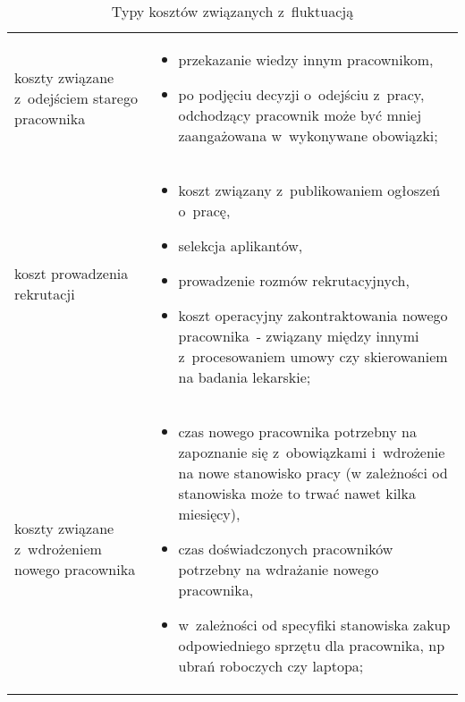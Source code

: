 \noindent\begin{minipage}{\textwidth}
             \begin{table}[H]
                 \raggedright\caption{Typy kosztów związanych z~fluktuacją\label{tabela:fluktuacja-koszty}}
                 \begin{center}
                     \begin{tabular}{|P{.15\textwidth}|P{.75\textwidth}|}

                         \hline
                          &
                          \\
                         \hline

                         koszty związane z~odejściem starego pracownika &
                         \begin{itemize}
                             \item przekazanie wiedzy innym pracownikom,
                             \item po podjęciu decyzji o~odejściu z~pracy, odchodzący pracownik może być mniej zaangażowana w~wykonywane obowiązki;
                         \end{itemize} \\

                         \hline

                         koszt prowadzenia rekrutacji &
                         \begin{itemize}
                             \item koszt związany z~publikowaniem ogłoszeń o~pracę,
                             \item selekcja aplikantów,
                             \item prowadzenie rozmów rekrutacyjnych,
                             \item koszt operacyjny zakontraktowania nowego pracownika~- związany między innymi z~procesowaniem umowy czy skierowaniem na badania lekarskie;
                         \end{itemize} \\
                         \hline

                         koszty związane z~wdrożeniem nowego pracownika &
                         \begin{itemize}
                             \item czas nowego pracownika potrzebny na zapoznanie się z~obowiązkami i~wdrożenie na nowe stanowisko pracy (w zależności od stanowiska może to trwać nawet kilka miesięcy),
                             \item czas doświadczonych pracowników potrzebny na wdrażanie nowego pracownika,
                             \item w~zależności od specyfiki stanowiska zakup odpowiedniego sprzętu dla pracownika, np ubrań roboczych czy laptopa;
                         \end{itemize} \\
                         \hline


\end{tabular}
\end{center}
\end{table}
\end{minipage}
